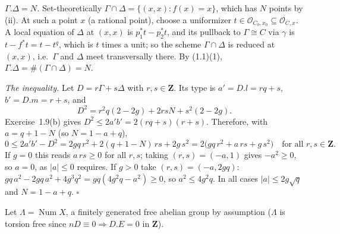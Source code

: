 \documentclass[11pt]{article}
\begin{document}
\emph{$\Gamma.\Delta=N$.} Set-theoretically $\Gamma\cap\Delta=\{(x,x):f(x)=x\}$, which has $N$ points by (ii). At such a point $x$ (a rational point), choose a uniformizer $t\in\mathcal O_{C_0,x_0}\subseteq\mathcal O_{C,x}$. A local equation of $\Delta$ at $(x,x)$ is $p_1^*t-p_2^*t$, and its pullback to $\Gamma\cong C$ via $\gamma$ is $t-f^*t=t-t^q$, which is $t$ times a unit; so the scheme $\Gamma\cap\Delta$ is reduced at $(x,x)$, i.e.\ $\Gamma$ and $\Delta$ meet transversally there. By (1.1)(1), $\Gamma.\Delta=\#(\Gamma\cap\Delta)=N$.

\emph{The inequality.} Let $D=r\Gamma+s\Delta$ with $r,s\in\mathbf Z$. Its type is $a'=D.l=rq+s$, $b'=D.m=r+s$, and
\[ D^2=r^2q(2-2g)+2rsN+s^2(2-2g). \]
Exercise~1.9(b) gives $D^2\le2a'b'=2(rq+s)(r+s)$. Therefore, with $a=q+1-N$ (so $N=1-a+q$),
\[ 0\le2a'b'-D^2=2gq\,r^2+2(q+1-N)\,rs+2g\,s^2=2\bigl(gq\,r^2+a\,rs+g\,s^2\bigr)\quad\text{for all }r,s\in\mathbf Z. \]
If $g=0$ this reads $a\,rs\ge0$ for all $r,s$; taking $(r,s)=(-a,1)$ gives $-a^2\ge0$, so $a=0$, as $|a|\le0$ requires. If $g>0$ take $(r,s)=(-a,2gq)$: $gq\,a^2-2gq\,a^2+4g^3q^2=gq(4g^2q-a^2)\ge0$, so $a^2\le4g^2q$. In all cases $|a|\le2g\sqrt q$ and $N=1-a+q$. \hfill$\square$

\pf
Let $\Lambda=\operatorname{Num}X$, a finitely generated free abelian group by assumption ($\Lambda$ is torsion free since $nD\equiv0\Rightarrow D.E=0$ in $\mathbf Z$).
\end{document}
